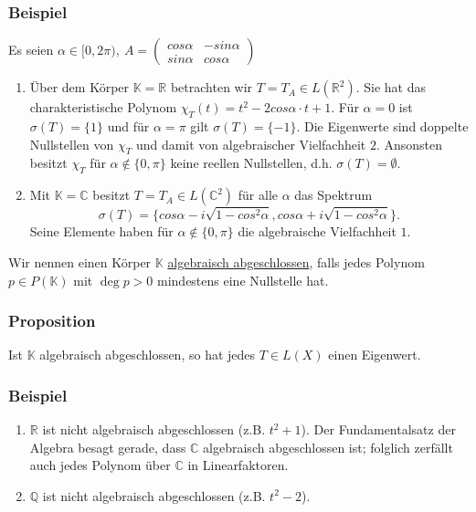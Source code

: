 \subsubsection{Beispiel}
\label{4.3.4}
Es seien $\alpha \in [0,2\pi ),\ A=\begin{pmatrix}cos \alpha & -sin \alpha\\ sin\alpha & cos\alpha \end{pmatrix}$
\begin{enumerate}
\item Über dem Körper $\mathbb{K}=\mathbb{R}$ betrachten wir $T=T_A\in L(\mathbb{R}^2)$.  Sie hat das charakteristische Polynom $\chi _T(t)=t^2-2cos\alpha \cdot t+1$.  Für $\alpha =0$ ist $\sigma (T)=\{1\}$ und für $\alpha = \pi$ gilt $\sigma (T)=\{-1\}$.  Die Eigenwerte sind doppelte Nullstellen von $\chi _T$ und damit von algebraischer Vielfachheit $2$.  Ansonsten besitzt $\chi _T$ für $\alpha \not\in \{0,\pi\}$ keine reellen Nullstellen, d.h. $\sigma (T)=\emptyset$.
\item Mit $\mathbb{K}=\mathbb{C}$ besitzt $T=T_A\in L(\mathbb{C}^2)$ für alle $\alpha$ das Spektrum
\[\sigma (T)=\{cos\alpha -i\sqrt{1-cos^2\alpha }, cos\alpha +i\sqrt{1-cos^2\alpha }\}.\]
Seine Elemente haben für $\alpha\not\in \{0,\pi \}$ die algebraische Vielfachheit $1$.
\end{enumerate}
Wir nennen einen Körper $\mathbb{K}$ \underline{algebraisch abgeschlossen}, falls jedes Polynom $p\in P(\mathbb{K})$ mit $\deg p>0$ mindestens eine Nullstelle hat.
\subsubsection{Proposition}
Ist $\mathbb{K}$ algebraisch abgeschlossen, so hat jedes $T\in L(X)$ einen Eigenwert.
\subsubsection{Beispiel}
\begin{enumerate}
\item $\mathbb{R}$ ist nicht algebraisch abgeschlossen (z.B. $t^2 +1$).  Der Fundamentalsatz der Algebra besagt gerade, dass $\mathbb{C}$ algebraisch abgeschlossen ist; folglich zerfällt auch jedes Polynom über $\mathbb{C}$ in Linearfaktoren.
\item $\mathbb{Q}$ ist nicht algebraisch abgeschlossen (z.B. $t^2-2$).
\end{enumerate}
